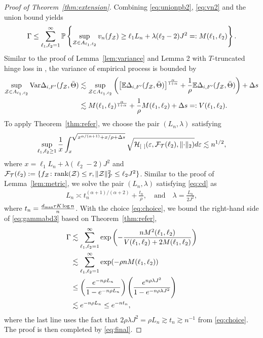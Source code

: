 \documentclass[11pt]{article}
\theoremstyle{plain}
\theoremstyle{definition}
\begin{document}
\begin{proof}[Proof of Theorem~\ref{thm:extension}]
Combining \eqref{eq:unionpb2},  \eqref{eq:vn2} and the union bound yields
\begin{align}\label{eq:gammabd3}
\Gamma\leq \sum_{\ell_1,\ell_2=1}^\infty\mathbb{P}\left\{\sup_{\mathcal{Z}\in A_{\ell_1,\ell_2}} v_n(f_{\mathcal{Z}})\geq  \ell_1 L_n+\lambda(\ell_2-2)J^2=:M(\ell_1,\ell_2) \right\}.
\end{align}
Similar to the proof of Lemma~\ref{lem:variance} and Lemma 2 with $T$-truncated hinge loss in \cite{lee2021nonparametric}, the variance of empirical process is bounded by 
\begin{align}
\sup_{\mathcal{Z}\in A_{\ell_1,\ell_2}}\textup{Var}\Delta_{i,F'}(f_{\mathcal{Z}},\bar \Theta)& \lesssim \sup_{\mathcal{Z}\in A_{\ell_1,\ell_2}}\left( \left[\mathbb{E}\Delta_{i,F'}(f_{\mathcal{Z}},\bar \Theta)\right]^{\alpha \over 1+\alpha}+{1\over \rho}\mathbb{E}\Delta_{i,F'}(f_{\mathcal{Z}},\bar \Theta)\right)+\Delta s \\&\lesssim M(\ell_1,\ell_2)^{\alpha\over 1+\alpha}+\frac{1}{\rho}M(\ell_1,\ell_2) +\Delta s =: V(\ell_1,\ell_2).
\end{align}
To apply Theorem~\ref{thm:refer}, we choose the pair $(L_n,\lambda)$ satisfying
\begin{align}\label{eq:cd}
\sup_{\ell_1,\ell_2\geq 1}{1\over x}\int_{x}^{\sqrt{x^{\alpha/(\alpha+1)}+x/\rho+\Delta s}}\sqrt{\tH_{[\ ]}(\varepsilon, \tF_{\tT}(\ell_2),\vnormSize{}{\cdot})}d\varepsilon \lesssim n^{1/2}, 
\end{align}
where $x=\ell_1 L_n+\lambda(\ell_2-2)J^2$ and $\mathcal{F}_{\mathcal{T}}(\ell_2):= \{f_{\mathcal{Z}}\colon \text{rank}(\mathcal{Z})\leq r, \lVert\mathcal{Z}\rVert_F^2\leq \ell_2J^2\}$.
Similar to the proof of Lemma~\ref{lem:metric}, we solve the pair $(L_n,\lambda)$ satisfying \eqref{eq:cd} as
\begin{align}\label{eq:choice}
L_n\asymp t_n^{(\alpha+1)/(\alpha+2)}+\frac{t_n}{\rho},\quad\text{and}\quad\lambda =  \frac{L_n}{2J^2},
\end{align}where $ t_n={d_{\max}rK\log n \over n}$.
With the choice \eqref{eq:choice}, we bound the right-hand side of \eqref{eq:gammabd3} based on Theorem~\ref{thm:refer}, 
\begin{align}\label{eq:gammabd4}
\Gamma&\lesssim \sum_{\ell_1,\ell_2=1}^\infty \exp\left(-\frac{nM^2(\ell_1,\ell_2)}{V(\ell_1,\ell_2)+2M(\ell_1,\ell_2)}\right)\\&\lesssim \sum_{\ell_1,\ell_2=1}^\infty	\exp(-\rho  n M(\ell_1,\ell_2))\\&\leq \left(e^{-n\rho L_n}\over 1-e^{-n\rho L_n}\right)\left(e^{n\rho \lambda J^2}\over 1-e^{-n\rho \lambda J^2}\right)\\&\lesssim e^{-n\rho L_n}\leq e^{-nt_n},
\end{align}
where the last line uses the fact that $2\rho\lambda J^2= \rho L_n\gtrsim t_n\gtrsim n^{-1}$ from \eqref{eq:choice}. The proof is then completed by \eqref{eq:final}.
\end{proof}
\end{document}
